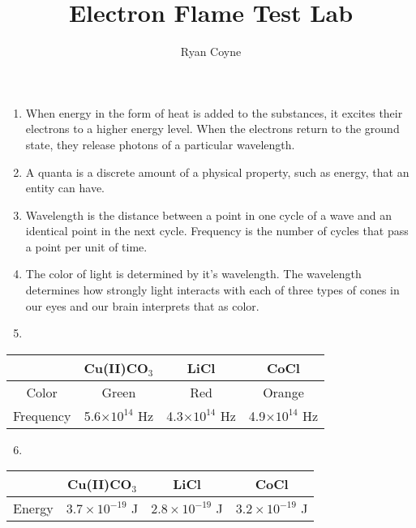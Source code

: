 \documentclass[12pt]{article}
\begin{document}
    \title{Electron Flame Test Lab}
    \author{Ryan Coyne}
    \maketitle
    \begin{enumerate}
        \item When energy in the form of heat is added to the substances, it excites their electrons to a higher energy level. When the electrons return to the ground state, they release photons of a particular wavelength.
        \item A quanta is a discrete amount of a physical property, such as energy, that an entity can have.
        \item Wavelength is the distance between a point in one cycle of a wave and an identical point in the next cycle. Frequency is the number of cycles that pass a point per unit of time.
        \item The color of light is determined by it's wavelength. The wavelength determines how strongly light interacts with each of three types of cones in our eyes and our brain interprets that as color.
        \item
    \end{enumerate} 
    \begin{table}[h]
        \centering
            \begin{tabular}{c|ccc}
                & Cu(II)CO\(_3\) & LiCl & CoCl\\
                \hline
                Color & Green & Red & Orange \\
                Frequency & 5.6\(\times 10^{14}\) Hz & 4.3\(\times 10^{14}\) Hz & 4.9\(\times 10^{14}\) Hz
            \end{tabular}
    \end{table}
    \begin{enumerate}
        \setcounter{enumi}{5}
        \item 
    \end{enumerate}
    \begin{table}[h]
        \centering
            \begin{tabular}{c|ccc}
                & Cu(II)CO\(_3\) & LiCl & CoCl\\
                \hline
                Energy & \(3.7 \times 10^{-19}\) J & \(2.8 \times 10^{-19}\) J & \(3.2 \times 10^{-19}\) J
            \end{tabular}
    \end{table}
\end{document}

